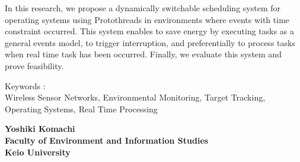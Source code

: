 In this research, we propose 
a dynamically switchable scheduling system for operating systems 
using Protothreads
in environments where events with time constraint occurred.
This system enables to save energy by executing tasks 
as a general events model,
to trigger interruption, and 
preferentially to process tasks 
when real time task has been occurred.
Finally, we evaluate this system and prove feasibility.


\vspace{10mm}
Keywords :\\
\hspace{3.5em}Wireless Sensor Networks, Environmental Monitoring, Target Tracking, Operating Systems, Real Time Processing 
\begin{flushright}
\textbf{Yoshiki Komachi}\\
\vspace{5mm}
\textbf{Faculty of Environment and Information Studies}\\
\textbf{Keio University}
\end{flushright}
